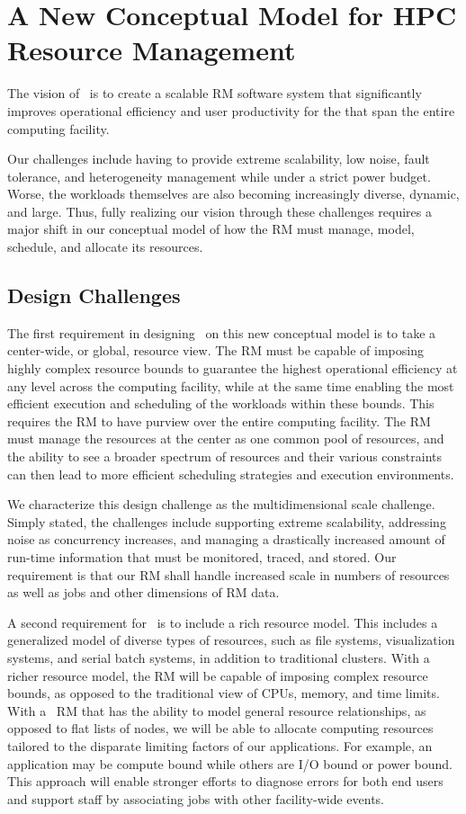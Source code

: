\section{A New Conceptual Model for HPC Resource Management}
The vision of \flux\ is to create a scalable RM
software system that significantly improves
operational efficiency and user productivity
for the that span the entire
computing facility.
\ifcomments
{}

Our challenges include having to provide extreme
scalability, low noise, fault tolerance, 
and heterogeneity management while under a strict power budget.
Worse, the workloads themselves are also becoming
increasingly diverse, dynamic, and large.
Thus, fully realizing our vision through
these challenges requires a major shift
in our conceptual model of how the RM must manage, model, schedule, 
and allocate its resources.

\subsection{Design Challenges}

The first requirement in designing \flux\ on this
new conceptual model is to take a center-wide, or global,
resource view.  The RM must be capable of
imposing highly complex resource bounds
to guarantee the highest operational efficiency
at any level across the computing facility, 
while at the same time enabling the most efficient
execution and scheduling of the workloads
within these bounds.
This requires the RM to have purview over 
the entire computing facility. 
The RM must manage the resources at the center
as one common pool of resources, and the ability
to see a broader spectrum of resources
and their various constraints can then lead to
more efficient scheduling strategies
and execution environments. 

We characterize this design challenge as the multidimensional
scale challenge.  Simply stated, the challenges include
supporting extreme scalability, addressing noise as concurrency
increases, and managing a drastically increased amount of
run-time information that must be monitored, traced, and stored.
Our requirement is that our RM shall handle increased scale in
numbers of resources as well as jobs and other dimensions of RM data.

A second requirement for \flux\ is to include a rich resource model.
This includes a generalized model of diverse types of resources,
such as file systems, visualization systems, and serial batch systems,
in addition to traditional clusters.   With a richer resource model,
the RM will be capable of imposing complex resource bounds,
as opposed to the traditional view of CPUs, memory, and time limits.
With a \flux\ RM that has the ability to model general resource
relationships, as opposed to flat lists of nodes, we will be able
to allocate computing resources tailored to the disparate limiting
factors of our applications.  For example, an application may be
compute bound while others are I/O bound or power bound.
This approach will enable stronger efforts to diagnose errors
for both end users and support staff by associating jobs
with other facility-wide events.

